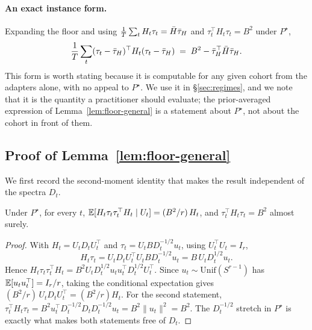 \paragraph{An exact instance form.} Expanding the floor and using
$\frac1T\sum_t H_t\tau_t = \bar H\bar{\tau}_H$ and
$\tau_t^\top H_t \tau_t = B^2$ under $P^\star$,
\begin{equation}\label{eq:floor-exact}
  \frac1T\sum_t (\tau_t-\bar{\tau}_H)^\top H_t (\tau_t-\bar{\tau}_H)
  \;=\; B^2 - \bar{\tau}_H^\top \bar H \bar{\tau}_H .
\end{equation}
This form is worth stating because it is computable for any given cohort from
the adapters alone, with no appeal to $P^\star$. We use it in
\S\ref{sec:regimes}, and we note that it is the quantity a practitioner should
evaluate; the prior-averaged expression of Lemma~\ref{lem:floor-general} is a
statement about $P^\star$, not about the cohort in front of them.

\subsection{Proof of Lemma~\ref{lem:floor-general}}

We first record the second-moment identity that makes the result independent
of the spectra $D_t$.

\begin{claim}\label{clm:second-moment}
Under $P^\star$, for every $t$,
$\mathbb{E}[H_t \tau_t \tau_t^\top H_t \mid U_t] = (B^2/r)\, H_t$, and
$\tau_t^\top H_t \tau_t = B^2$ almost surely.
\end{claim}

\begin{proof}
With $H_t = U_t D_t U_t^\top$ and $\tau_t = U_t B D_t^{-1/2} u_t$, using
$U_t^\top U_t = I_r$,
\begin{equation*}
  H_t \tau_t = U_t D_t U_t^\top U_t B D_t^{-1/2} u_t
             = B\, U_t D_t^{1/2} u_t .
\end{equation*}
Hence $H_t \tau_t \tau_t^\top H_t = B^2 U_t D_t^{1/2} u_t u_t^\top D_t^{1/2}
U_t^\top$. Since $u_t \sim \mathrm{Unif}(S^{r-1})$ has
$\mathbb{E}[u_t u_t^\top] = I_r / r$, taking the conditional expectation gives
$(B^2/r)\,U_t D_t U_t^\top = (B^2/r) H_t$. For the second statement,
$\tau_t^\top H_t \tau_t = B^2 u_t^\top D_t^{-1/2} D_t D_t^{-1/2} u_t
= B^2 \|u_t\|^2 = B^2$. The $D_t^{-1/2}$ stretch in $P^\star$ is exactly what
makes both statements free of $D_t$.
\end{proof}

